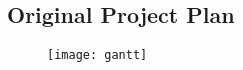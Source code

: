 \newpage

\begin{landscape}
\begin{appendices}
\section{Original Project Plan} \label{appx:plan}
\begin{figure}[ht!]
   \centering
   \texttt{[image: gantt]}
\end{figure}
\end{appendices}
\end{landscape}
